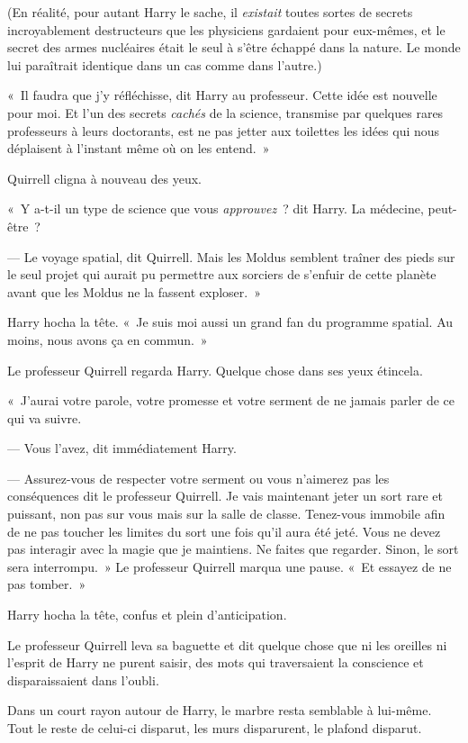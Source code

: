 (En réalité, pour autant Harry le sache, il \emph{existait} toutes sortes de secrets incroyablement destructeurs que les physiciens gardaient pour eux-mêmes, et le secret des armes nucléaires était le seul à s'être échappé dans la nature.
Le monde lui paraîtrait identique dans un cas comme dans l'autre.)

«~Il faudra que j'y réfléchisse, dit Harry au professeur.
Cette idée est nouvelle pour moi.
Et l'un des secrets \emph{cachés} de la science, transmise par quelques rares professeurs à leurs doctorants, est ne pas jetter aux toilettes les idées qui nous déplaisent à l'instant même où on les entend.~»

Quirrell cligna à nouveau des yeux.

«~Y a-t-il un type de science que vous \emph{approuvez}~? dit Harry.
La médecine, peut-être~?

--- Le voyage spatial, dit Quirrell.
Mais les Moldus semblent traîner des pieds sur le seul projet qui aurait pu permettre aux sorciers de s'enfuir de cette planète avant que les Moldus ne la fassent exploser.~»

Harry hocha la tête.
«~Je suis moi aussi un grand fan du programme spatial.
Au moins, nous avons ça en commun.~»

Le professeur Quirrell regarda Harry.
Quelque chose dans ses yeux étincela.

«~J'aurai votre parole, votre promesse et votre serment de ne jamais parler de ce qui va suivre.

--- Vous l'avez, dit immédiatement Harry.

--- Assurez-vous de respecter votre serment ou vous n'aimerez pas les conséquences dit le professeur Quirrell.
Je vais maintenant jeter un sort rare et puissant, non pas sur vous mais sur la salle de classe.
Tenez-vous immobile afin de ne pas toucher les limites du sort une fois qu'il aura été jeté.
Vous ne devez pas interagir avec la magie que je maintiens.
Ne faites que regarder.
Sinon, le sort sera interrompu.~»
Le professeur Quirrell marqua une pause.
«~Et essayez de ne pas tomber.~»

Harry hocha la tête, confus et plein d'anticipation.

Le professeur Quirrell leva sa baguette et dit quelque chose que ni les oreilles ni l'esprit de Harry ne purent saisir, des mots qui traversaient la conscience et disparaissaient dans l'oubli.

Dans un court rayon autour de Harry, le marbre resta semblable à lui-même.
Tout le reste de celui-ci disparut, les murs disparurent, le plafond disparut.

